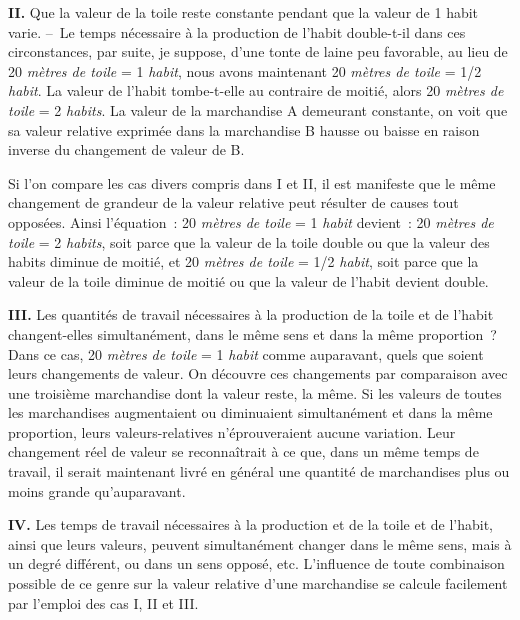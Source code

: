 \documentclass[french,twoside]{book} %
\begin{document}
\textbf{II.} Que la valeur de la toile reste constante pendant que la valeur de 1 habit varie. – Le temps nécessaire à la production de l’habit double-t-il dans ces circonstances, par suite, je suppose, d’une tonte de laine peu favorable, au lieu de 20 \emph{mètres de toile} = 1 \emph{habit}, nous avons maintenant 20 \emph{mètres de toile} = 1/2 \emph{habit}. La valeur de l’habit tombe-t-elle au contraire de moitié, alors 20 \emph{mètres de toile} = 2 \emph{habits}. La valeur de la marchandise A demeurant constante, on voit que sa valeur relative exprimée dans la marchandise B hausse ou baisse en raison inverse du changement de valeur de B.\par
Si l’on compare les cas divers compris dans I et II, il est manifeste que le même changement de grandeur de la valeur relative peut résulter de causes tout opposées. Ainsi l’équation : 20 \emph{mètres de toile} = 1 \emph{habit} devient : 20 \emph{mètres de toile} = 2 \emph{habits}, soit parce que la valeur de la toile double ou que la valeur des habits diminue de moitié, et 20 \emph{mètres de toile} = 1/2 \emph{habit}, soit parce que la valeur de la toile diminue de moitié ou que la valeur de l’habit devient double.\par
\textbf{III.} Les quantités de travail nécessaires à la production de la toile et de l’habit changent-elles simultanément, dans le même sens et dans la même proportion ? Dans ce cas, 20 \emph{mètres de toile} = 1 \emph{habit} comme auparavant, quels que soient leurs changements de valeur. On découvre ces changements par comparaison avec une troisième marchandise dont la valeur reste, la même. Si les valeurs de toutes les marchandises augmentaient ou diminuaient simultanément et dans la même proportion, leurs valeurs-relatives n’éprouveraient aucune variation. Leur changement réel de valeur se reconnaîtrait à ce que, dans un même temps de travail, il serait maintenant livré en général une quantité de marchandises plus ou moins grande qu’auparavant.\par
\textbf{IV.} Les temps de travail nécessaires à la production et de la toile et de l’habit, ainsi que leurs valeurs, peuvent simultanément changer dans le même sens, mais à un degré différent, ou dans un sens opposé, etc. L’influence de toute combinaison possible de ce genre sur la valeur relative d’une marchandise se calcule facilement par l’emploi des cas I, II et III.\par
\end{document}
